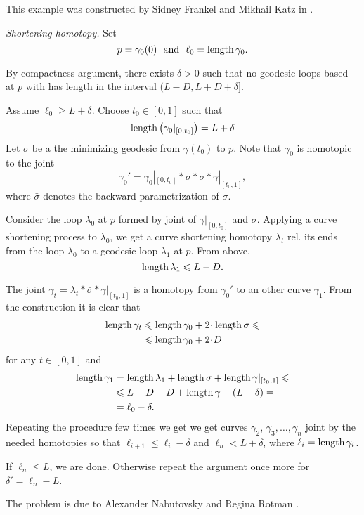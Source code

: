 This example was constructed by Sidney Frankel and Mikhail Katz in \cite{frankel-katz}.
 

\textit{Shortening homotopy.}
Set 
\[p=\gamma_0(0)\ \ \text{and}\ \  \ell_0=\length\gamma_0.\]

By compactness argument,
there exists $\delta>0$ 
such that no geodesic loops based at $p$ with has length in the interval $(L-D, L+D+\delta]$. 

Assume $\ell_0\ge L+\delta$.
Choose $t_0\in [0,1]$ such that
\[\operatorname{\rm length}\left(\gamma_0|_{[0,t_0]}\right)=L+\delta\]
Let $\sigma$ be a the minimizing geodesic from $\gamma(t_0)$
to $p$.
Note that $\gamma_0$ is homotopic to the joint 
\[\gamma_0'=\gamma_0|_{[0,t_0]}*\sigma*\bar\sigma*\gamma|_{[t_0,1]},\]
where $\bar\sigma$ denotes the backward parametrization of $\sigma$.

Consider the loop $\lambda_0$ at $p$
formed by joint of $\gamma|_{[0,t_0]}$ and $\sigma$.
Applying a curve shortening process to $\lambda_0$, 
we get a curve shortening homotopy $\lambda_t$
rel. its ends 
from the loop $\lambda_0$ to a geodesic loop $\lambda_1$ at $p$.
From above, 
\[\operatorname{\rm length}\lambda_1\leqslant L-D.\]

The joint $\gamma_t=\lambda_t*\bar\sigma*\gamma|_{[t_0,1]}$
is a homotopy
from $\gamma_0'$ to an other curve $\gamma_1$.
From the construction it is clear that 
\begin{align*}
 \length \gamma_t&\le \length \gamma_0+2\cdot \length\sigma\le
 \\
 &\le \length \gamma_0+2\cdot D
\end{align*}
for any $t\in[0,1]$
and 
\begin{align*}
 \operatorname{\rm length} \gamma_1&=\operatorname{\rm length}\lambda_1+\operatorname{\rm length}\sigma+\operatorname{\rm length}\gamma|_{[t_0,1]}\leqslant
\\ &\leqslant L-D+D+\operatorname{\rm length}\gamma-(L+\delta)=
\\ &=\ell_0 -\delta.
\end{align*}
Repeating the procedure few times we get we get curves $\gamma_2$, $\gamma_3,\dots,\gamma_n$
joint by the needed homotopies so that 
$\ell_{i+1}\le\ell_i-\delta$ and $\ell_n< L+\delta$,
where $\ell_i=\operatorname{\rm length}\gamma_i$.

If $\ell_n\le L$, we are done.
Otherwise repeat the argument once more for $\delta'=\ell_n-L$.

The problem is due to 
Alexander Nabutovsky 
and Regina Rotman \cite[see][]{nabutovsky-rotman}.

